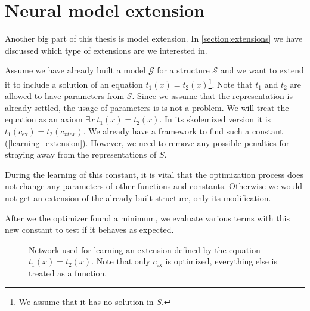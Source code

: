 \section{Neural model extension}
Another big part of this thesis is model extension. In \autoref{section:extensions} we have discussed which type of extensions are we interested in.

Assume we have already built a model $\mathcal{G}$ for a structure $\mathcal{S}$ and we want to extend it to include a solution of an equation $t_1(x)=t_2(x)$\footnote{We assume that it has no solution in $S$.}. Note that $t_1$ and $t_2$ are allowed to have parameters from $\mathcal{S}$. Since we assume that the representation is already settled, the usage of parameters is is not a problem. We will treat the equation as an axiom $\exists x\ t_1(x)=t_2(x)$. In its skolemized version it is $t_1(c_{\text{ex}})= t_2(c_{xt{ex}})$. We already have a framework to find such a constant (\autoref{learning_extension}). However, we need to remove any possible penalties for straying away from the representations of $S$. 

During the learning of this constant, it is vital that the optimization process does not change any parameters of other functions and constants. Otherwise we would not get an  extension of the already built structure, only its modification. 

After we the optimizer found a minimum, we evaluate various terms with this new constant to test if it behaves as expected.

\begin{figure}
\caption{Network used for learning an extension defined by the equation $t_1(x)=t_2(x)$. Note that only $c_{\text{ex}}$ is optimized, everything else is treated as a function.}
\centering
\label{learning_extension}
\end{figure}

